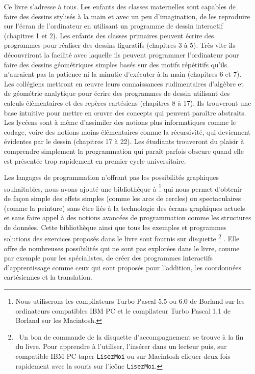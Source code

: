 \medskip

Ce livre s'adresse à tous. Les enfants des classes maternelles sont capables
de faire des dessins stylisés à la main et avec un peu d'imagination, de les 
reproduire sur l'écran
de l'ordinateur en utilisant un programme de dessin interactif (chapitres 1 et 2).
Les enfants des classes primaires peuvent écrire des programmes pour réaliser 
des dessins  figuratifs (chapitres 3 à 5). Très vite ils découvriront la facilité avec 
la\-quel\-le ils peuvent programmer l'ordinateur pour faire des dessins géométriques simples basés sur des
motifs répétitifs qu'ils n'auraient pas la patience ni la minutie d'exécuter
à la main (chapitres 6 et 7). Les collégiens mettront en œuvre leurs
connaissances rudimentaires d'algèbre et de géométrie analytique pour écrire des 
programmes de dessin
utilisant des calculs élémentaires et des repères cartésiens (chapitres 8 à 17). 
Ils trouveront une base 
intuitive pour mettre en œuvre des
concepts qui peuvent paraître abstraits. Les
lycéens sont à même d'assimiler des notions plus informatiques comme le 
codage, voire des notions moins élémentaires comme la 
récursivité, qui deviennent évidentes par le dessin (chapitres 17 à 22). Les étudiants
trouveront du plaisir à comprendre simplement la programmation qui paraît parfois obscure quand
elle est présentée trop rapidement en premier cycle universitaire. 

\medskip

Les langages de programmation n'offrant pas les possibilités graphiques 
souhaitables, nous avons ajouté une bi\-blio\-thè\-que à \pascal\@%
%
\footnote{Nous utiliserons les 
compilateurs Turbo Pascal 5.5 ou 6.0 de Borland sur les or\-di\-na\-teurs compatibles 
IBM PC et le compilateur Turbo Pascal 1.1 de Borland sur les Macintosh.}
%
qui nous permet
d'obtenir de façon simple des effets simples (comme les arcs de cercles) ou
spectaculaires (comme la peinture) sans être liés à la technologie des
écrans graphiques actuels et sans faire appel à des notions avancées de
programmation comme les structures de données. Cette bibliothèque ainsi
que tous les exemples et programmes solutions des exercices proposés dans le livre
sont fournis sur disquette%
%
\footnote{\ Un bon de commande de la disquette d'accompagnement se
trouve à la fin du livre. Pour apprendre à l'utiliser, l'insérer dans un 
lecteur puis, sur compatible IBM PC taper {\tt LisezMoi} ou sur Macintosh
cliquer deux fois rapidement avec la souris sur l'icône {\tt LisezMoi}.}%
. Elle offre de nombreuses possibilités qui ne sont pas explorées dans le livre,
comme par exemple pour les spécialistes, de créer des programmes interactifs d'apprentissage
comme ceux qui sont proposés pour l'addition, les coordonnées cartésiennes et la
translation.

